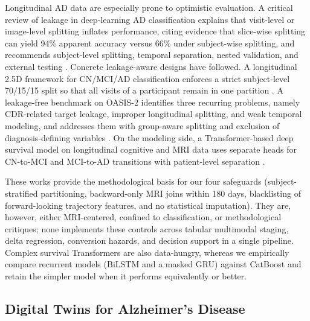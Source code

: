 \documentclass[11pt,a4paper]{article}
\begin{document}
Longitudinal AD data are especially prone to optimistic evaluation. A critical review of leakage in deep-learning AD classification explains that visit-level or image-level splitting inflates performance, citing evidence that slice-wise splitting can yield 94\% apparent accuracy versus 66\% under subject-wise splitting, and recommends subject-level splitting, temporal separation, nested validation, and external testing \cite{leakage2025dl}. Concrete leakage-aware designs have followed. A longitudinal 2.5D framework for CN/MCI/AD classification enforces a strict subject-level 70/15/15 split so that all visits of a participant remain in one partition \cite{pmc2026longitudinal25d}. A leakage-free benchmark on OASIS-2 identifies three recurring problems, namely CDR-related target leakage, improper longitudinal splitting, and weak temporal modeling, and addresses them with group-aware splitting and exclusion of diagnosis-defining variables \cite{pmc2026leakagefree}. On the modeling side, a Transformer-based deep survival model on longitudinal cognitive and MRI data uses separate heads for CN-to-MCI and MCI-to-AD transitions with patient-level separation \cite{sciopen2025survival}.

These works provide the methodological basis for our four safeguards (subject-stratified partitioning, backward-only MRI joins within 180 days, blacklisting of forward-looking trajectory features, and no statistical imputation). They are, however, either MRI-centered, confined to classification, or methodological critiques; none implements these controls across tabular multimodal staging, delta regression, conversion hazards, and decision support in a single pipeline. Complex survival Transformers are also data-hungry, whereas we empirically compare recurrent models (BiLSTM and a masked GRU) against CatBoost and retain the simpler model when it performs equivalently or better.

\subsection{Digital Twins for Alzheimer's Disease}
\label{subsec:rw_dt}
\end{document}
